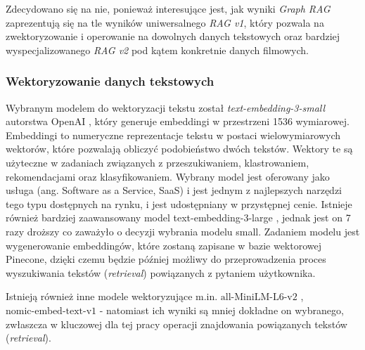 \documentclass[
a4paper,
12pt,
]{article}
\newcounter{subsubsubsection}[subsubsection]
\begin{document}
Zdecydowano się na nie, ponieważ interesujące jest, jak wyniki \textit{Graph RAG} zaprezentują się na tle wyników uniwersalnego \textit{RAG v1}, który pozwala na zwektoryzowanie i operowanie na dowolnych danych tekstowych oraz bardziej wyspecjalizowanego \textit{RAG v2} pod kątem konkretnie danych filmowych.

\subsubsection{Wektoryzowanie danych tekstowych}


Wybranym modelem do wektoryzacji tekstu został \textit{text-embedding-3-small} autorstwa OpenAI \cite{te3s}, który generuje embeddingi w przestrzeni 1536 wymiarowej.
Embeddingi to numeryczne reprezentacje tekstu w postaci wielowymiarowych wektorów, które pozwalają obliczyć podobieństwo dwóch tekstów. Wektory te są użyteczne w zadaniach związanych z przeszukiwaniem, klastrowaniem, rekomendacjami oraz klasyfikowaniem.
Wybrany model jest oferowany jako usługa (ang. Software as a Service, SaaS) i jest jednym z najlepszych narzędzi tego typu dostępnych na rynku, i jest udostępniany w przystępnej cenie. Istnieje również bardziej zaawansowany model text-embedding-3-large \cite{te3l}, jednak jest on 7 razy droższy co zaważyło o decyzji wybrania modelu small. Zadaniem modelu jest wygenerowanie embeddingów, które zostaną zapisane w bazie wektorowej Pinecone, dzięki czemu będzie później możliwy do przeprowadzenia proces wyszukiwania tekstów (\textit{retrieval}) powiązanych z pytaniem użytkownika.

Istnieją również inne modele wektoryzujące m.in. $\text{all-MiniLM-L6-v2}$ \cite{miniLM}, \linebreak{}$\text{nomic-embed-text-v1}$ \cite{nomic} - natomiast ich wyniki są mniej dokładne on wybranego, zwłaszcza w kluczowej dla tej pracy operacji znajdowania powiązanych tekstów (\textit{retrieval}). 

\end{document}
